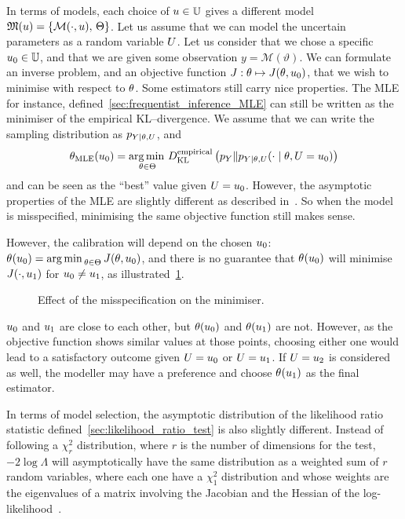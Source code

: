 \documentclass[../../Main_ManuscritThese.tex]{subfiles}
\newcommand\imgpath{/home/victor/acadwriting/Manuscrit/Text/Chapter2/img/}
\begin{document}

In terms of models, each choice of $\uu \in \Uspace$ gives a different
model $\mathfrak{M}(u) = \{\mathcal{M}(\cdot, u),\,\Kspace\}$. Let us
assume that we can model the uncertain parameters as a random variable
$\UU$.  Let us consider that we chose a specific $\uu_0 \in \Uspace$,
and that we are given some observation $y=\mathscr{M}(\vartheta)$. We can
formulate an inverse problem, and an objective function
$J:\kk \mapsto J(\kk,\uu_0)$, that we wish to minimise with respect to
$\kk$.  Some estimators still carry nice properties. The MLE for
instance, defined~\cref{sec:frequentist_inference_MLE} can still be
written as the minimiser of the empirical KL--divergence. We assume
that we can write the sampling distribution as $p_{Y \mid \KK, \UU}$,
and
\begin{equation}
  \estimtxt{\kk}{MLE}(\uu_0)=  \argmin_{\kk \in \Kspace}\DKL[empirical]{p_Y}{p_{Y \mid \kk, \UU}(\cdot \mid \kk, \UU=\uu_0)}
\end{equation}
and can be seen as the ``best'' value given $\UU=\uu_0$. However, the
asymptotic properties of the MLE are slightly different as described
in~\cite{white_maximum_1982}.  So when the model is misspecified,
minimising the same objective function still makes sense.

However, the calibration will depend on the chosen $\uu_0$:
$\estimtxt{\kk}{}(\uu_0) = \argmin_{\kk \in \Kspace} J(\kk,\uu_0)$, and
there is no guarantee that $\estimtxt{\kk}{}(\uu_0)$ will minimise
$J(\cdot, \uu_1)$ for $\uu_0 \neq \uu_1$, as
illustrated~\cref{fig:minimizer_misspecification}.

\begin{figure}[ht]
  \centering
  
  \caption{Effect of the misspecification on the minimiser.}
  \label{fig:minimizer_misspecification}
\end{figure}

$\uu_0$ and $\uu_1$ are close to each other, but ${\kk}(\uu_0)$ and
${\kk}(\uu_1)$ are not. However, as the objective function shows
similar values at those points, choosing either one would lead to a
satisfactory outcome given $\UU = \uu_0$ or $\UU=\uu_1$. If
$\UU = \uu_2$ is considered as well, the modeller may have a
preference and choose $\estimtxt{\kk}{}(\uu_1)$ as the final
estimator.

In terms of model selection, the asymptotic distribution of the
likelihood ratio statistic defined~\cref{sec:likelihood_ratio_test} is
also slightly different. Instead of following a $\chi^2_{r}$
distribution, where $r$ is the number of dimensions for the test,
$-2\log \Lambda$ will asymptotically have the same distribution as a
weighted sum of $r$ random variables, where each one have a $\chi^2_1$
distribution and whose weights are the eigenvalues of a matrix
involving the Jacobian and the Hessian of the
log-likelihood~\citep{kent_robust_1982}.
\end{document}
